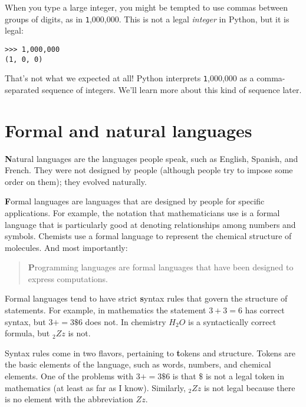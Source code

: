 \documentclass[
DIV=11,
fontsize=13,
twoside,
headinclude=false,
titlepage=firstiscover,
abstract=true,
headsepline=true,
footsepline=true,
chapterprefix=true, %
headings=big,
bibliography=totoc,%
captions=tableheading
]{scrbook}
\theoremstyle{definition}
\begin{document}
When you type a large integer, you might be tempted to use commas
between groups of digits, as in {\texttt 1,000,000}.  This is not a
legal {\em integer} in Python, but it is legal:

\begin{lstlisting}
>>> 1,000,000
(1, 0, 0)
\end{lstlisting}
%
That's not what we expected at all!  Python interprets {\texttt
  1,000,000} as a comma-separated sequence of integers.  We'll learn
more about this kind of sequence later.




\section{Formal and natural languages}

{\textbf Natural languages} are the languages people speak,
such as English, Spanish, and French.  They were not designed
by people (although people try to impose some order on them);
they evolved naturally.

{\textbf Formal languages} are languages that are designed by people for
specific applications.  For example, the notation that mathematicians
use is a formal language that is particularly good at denoting
relationships among numbers and symbols.  Chemists use a formal
language to represent the chemical structure of molecules.  And
most importantly:

\begin{quote}
{\textbf Programming languages are formal languages that have been
designed to express computations.}
\end{quote}

Formal languages tend to have strict {\textbf syntax} rules that
govern the structure of statements.
For example, in mathematics the statement
$3 + 3 = 6$ has correct syntax, but
$3 + = 3 \$ 6$ does not.  In chemistry
$H_2O$ is a syntactically correct formula, but $_2Zz$ is not.

Syntax rules come in two flavors, pertaining to {\textbf tokens} and
structure.  Tokens are the basic elements of the language, such as
words, numbers, and chemical elements.  One of the problems with
$3 += 3 \$ 6$ is that \( \$ \) is not a legal token in mathematics
(at least as far as I know).  Similarly, $_2Zz$ is not legal because
there is no element with the abbreviation $Zz$.
\end{document}
